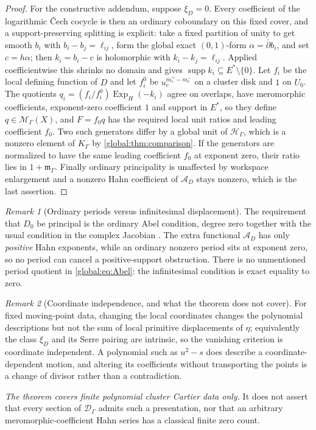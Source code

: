 \documentclass[11pt,letterpaper]{article}
\theoremstyle{definition}
\theoremstyle{remark}
\newtheorem{remark}[remark]{Remark}
\newcommand{\HH}{\mathscr H_\Gamma}
\newcommand{\KK}{K_\Gamma}
\newcommand{\mK}{\mathfrak m_\Gamma}
\newcommand{\supp}{\operatorname{supp}}
\newcommand{\ExpH}{\operatorname{Exp}_{H}}
\newcommand{\MG}{\mathscr M_\Gamma}
\newcommand{\DG}{\mathscr D_\Gamma}
\numberwithin{equation}{section}
\begin{document}
\begin{proof}
For the constructive addendum, suppose $\xi_D=0$. Every coefficient of the logarithmic \v Cech cocycle is then an ordinary coboundary on this fixed cover, and a support-preserving splitting is explicit: take a fixed partition of unity to get smooth $b_i$ with $b_i-b_j=\ell_{ij}$, form the global exact $(0,1)$-form $\alpha=\bar\partial b_i$, and set $c=h\alpha$; then $k_i=b_i-c$ is holomorphic with $k_i-k_j=\ell_{ij}$. Applied coefficientwise this shrinks no domain and gives $\supp k_i\subseteq E^*\setminus\{0\}$. Let $f_i$ be the local defining function of $D$ and let $f^0_i$ be $u_c^{m_c^+-m_c^-}$ on a cluster disk and $1$ on $U_0$. The quotients $q_i=(f_i/f^0_i)\ExpH(-k_i)$ agree on overlaps, have meromorphic coefficients, exponent-zero coefficient $1$ and support in $E^*$, so they define $q\in\MG(X)$, and $F=f_0q$ has the required local unit ratios and leading coefficient $f_0$. Two such generators differ by a global unit of $\HH$, which is a nonzero element of $\KK$ by \cref{global:thm:comparison}. If the generators are normalized to have the same leading coefficient $f_0$ at exponent zero, their ratio lies in $1+\mK$. Finally ordinary principality is unaffected by workspace enlargement and a nonzero Hahn coefficient of $\mathcal A_D$ stays nonzero, which is the last assertion.
\end{proof}

\begin{remark}[Ordinary periods versus infinitesimal displacement]\label{global:rem:periods}
The requirement that $D_0$ be principal is the ordinary Abel condition, degree zero together with the usual condition in the complex Jacobian \cite{Narasimhan}. The extra functional $\mathcal A_D$ has only \emph{positive} Hahn exponents, while an ordinary nonzero period sits at exponent zero, so no period can cancel a positive-support obstruction. There is no unmentioned period quotient in \eqref{global:eq:Abel}: the infinitesimal condition is exact equality to zero.
\end{remark}

\begin{remark}[Coordinate independence, and what the theorem does not cover]\label{global:rem:abelscope}
For fixed moving-point data, changing the local coordinates changes the polynomial descriptions but not the sum of local primitive displacements of $\eta$; equivalently the class $\xi_D$ and its Serre pairing are intrinsic, so the vanishing criterion is coordinate independent. A polynomial such as $u^2-s$ does describe a coordinate-dependent motion, and altering its coefficients without transporting the points is a change of divisor rather than a contradiction.

\emph{The theorem covers finite polynomial cluster Cartier data only.} It does not assert that every section of $\DG$ admits such a presentation, nor that an arbitrary meromorphic-coefficient Hahn series has a classical finite zero count.
\end{remark}
\end{document}
